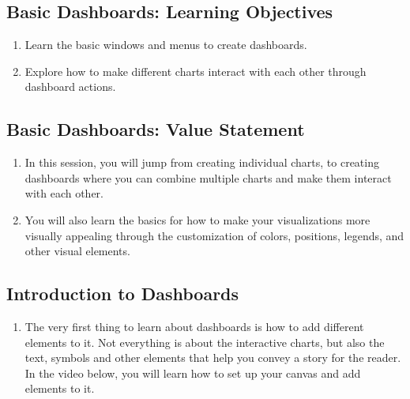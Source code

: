 \documentclass[
]{book}
\providecommand{\tightlist}{%
  \setlength{\itemsep}{0pt}\setlength{\parskip}{0pt}}
\begin{document}
\hypertarget{basic-dashboards-learning-objectives}{%
\subsection{Basic Dashboards: Learning Objectives}\label{basic-dashboards-learning-objectives}}

\begin{enumerate}
\def\labelenumi{\arabic{enumi}.}
\tightlist
\item
  Learn the basic windows and menus to create dashboards.
\item
  Explore how to make different charts interact with each other through dashboard actions.
\end{enumerate}

\hypertarget{basic-dashboards-value-statement}{%
\subsection{Basic Dashboards: Value Statement}\label{basic-dashboards-value-statement}}

\begin{enumerate}
\def\labelenumi{\arabic{enumi}.}
\tightlist
\item
  In this session, you will jump from creating individual charts, to creating dashboards where you can combine multiple charts and make them interact with each other.
\item
  You will also learn the basics for how to make your visualizations more visually appealing through the customization of colors, positions, legends, and other visual elements.
\end{enumerate}

\hypertarget{introduction-to-dashboards}{%
\subsection{Introduction to Dashboards}\label{introduction-to-dashboards}}

\begin{enumerate}
\def\labelenumi{\arabic{enumi}.}
\tightlist
\item
  The very first thing to learn about dashboards is how to add different elements to it. Not everything is about the interactive charts, but also the text, symbols and other elements that help you convey a story for the reader. In the video below, you will learn how to set up your canvas and add elements to it.\\
\end{enumerate}
\end{document}
